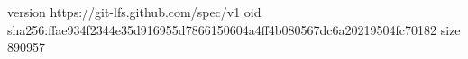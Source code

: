version https://git-lfs.github.com/spec/v1
oid sha256:ffae934f2344e35d916955d7866150604a4ff4b080567dc6a20219504fc70182
size 890957
